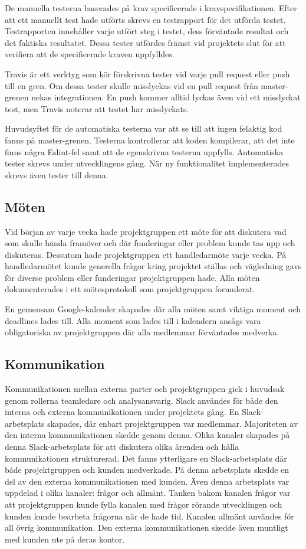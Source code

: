 De manuella testerna baserades på krav specificerade i kravspecifikationen. Efter att ett manuellt test hade utförts skrevs en testrapport för det utförda testet. Testrapporten innehåller varje utfört steg i testet, dess förväntade resultat och det faktiska resultatet. Dessa tester utfördes främst vid projektets slut för att verifiera att de specificerade kraven uppfylldes.

Travis är ett verktyg som kör förskrivna tester vid varje pull request eller push till en gren. Om dessa tester skulle misslyckas vid en pull request från master-grenen nekas integrationen. En push kommer alltid lyckas även vid ett misslyckat test, men Travis noterar att testet har misslyckats.

Huvudsyftet för de automatiska testerna var att se till att ingen felaktig kod fanns på master-grenen. Testerna kontrollerar att koden kompilerar, att det inte finns några Eslint-fel samt att de egenskrivna testerna uppfylls. Automatiska tester skrevs under utvecklingens gång. När ny funktionalitet implementerades skrevs även tester till denna.

\subsection{Möten}
Vid början av varje vecka hade projektgruppen ett möte för att diskutera vad som skulle hända framöver och där funderingar eller problem kunde tas upp och diskuteras. Dessutom hade projektgruppen ett handledarmöte varje vecka. På handledarmötet kunde generella frågor kring projektet ställas och vägledning gavs för diverse problem eller funderingar projektgruppen hade. Alla möten dokumenterades i ett mötesprotokoll som projektgruppen formulerat.

En gemensam Google-kalender skapades där alla möten samt viktiga moment och deadlines lades till. Alla moment som lades till i kalendern ansågs vara obligatoriska av projektgruppen där alla medlemmar förväntades medverka.

\subsection{Kommunikation}
Kommunikationen mellan externa parter och projektgruppen gick i huvudsak genom rollerna teamledare och analysansvarig. Slack användes för både den interna och externa kommunikationen under projektets gång. En Slack-arbetsplats skapades, där enbart projektgruppen var medlemmar. Majoriteten av den interna kommunikationen skedde genom denna. Olika kanaler skapades på denna Slack-arbetsplats för att diskutera olika ärenden och hålla kommunikationen strukturerad. Det fanns ytterligare en Slack-arbetsplats där både projektgruppen och kunden medverkade. På denna arbetsplats skedde en del av den externa kommunikationen med kunden. Även denna arbetsplats var uppdelad i olika kanaler: frågor och allmänt. Tanken bakom kanalen frågor var att projektgruppen kunde fylla kanalen med frågor rörande utvecklingen och kunden kunde bearbeta frågorna när de hade tid. Kanalen allmänt användes för all övrig kommunikation. Den externa kommunikationen skedde även muntligt med kunden ute på deras kontor.

